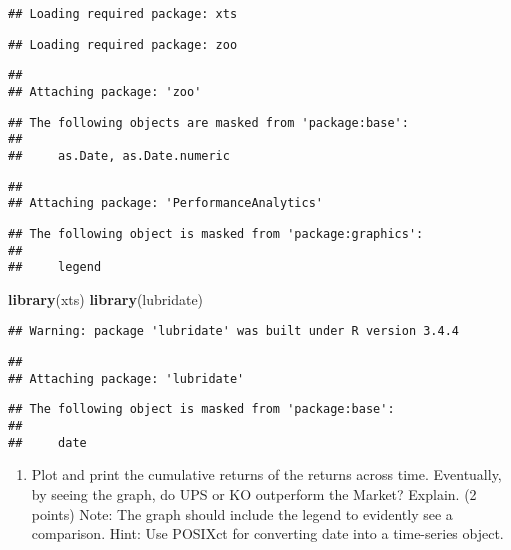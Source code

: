 \documentclass[]{article}
\newenvironment{Shaded}{\begin{snugshade}}{\end{snugshade}}
\newcommand{\KeywordTok}[1]{\textcolor[rgb]{0.13,0.29,0.53}{\textbf{{#1}}}}
\newcommand{\NormalTok}[1]{{#1}}
\providecommand{\tightlist}{%
  \setlength{\itemsep}{0pt}\setlength{\parskip}{0pt}}
\begin{document}
\begin{verbatim}
## Loading required package: xts
\end{verbatim}

\begin{verbatim}
## Loading required package: zoo
\end{verbatim}

\begin{verbatim}
## 
## Attaching package: 'zoo'
\end{verbatim}

\begin{verbatim}
## The following objects are masked from 'package:base':
## 
##     as.Date, as.Date.numeric
\end{verbatim}

\begin{verbatim}
## 
## Attaching package: 'PerformanceAnalytics'
\end{verbatim}

\begin{verbatim}
## The following object is masked from 'package:graphics':
## 
##     legend
\end{verbatim}

\begin{Shaded}
\begin{Highlighting}[]
\KeywordTok{library}\NormalTok{(xts)}
\KeywordTok{library}\NormalTok{(lubridate)}
\end{Highlighting}
\end{Shaded}

\begin{verbatim}
## Warning: package 'lubridate' was built under R version 3.4.4
\end{verbatim}

\begin{verbatim}
## 
## Attaching package: 'lubridate'
\end{verbatim}

\begin{verbatim}
## The following object is masked from 'package:base':
## 
##     date
\end{verbatim}

\begin{enumerate}
\def\labelenumi{\alph{enumi}.}
\setcounter{enumi}{1}
\tightlist
\item
  Plot and print the cumulative returns of the returns across time.
  Eventually, by seeing the graph, do UPS or KO outperform the Market?
  Explain. (2 points) Note: The graph should include the legend to
  evidently see a comparison. Hint: Use POSIXct for converting date into
  a time-series object.
\end{enumerate}
\end{document}
